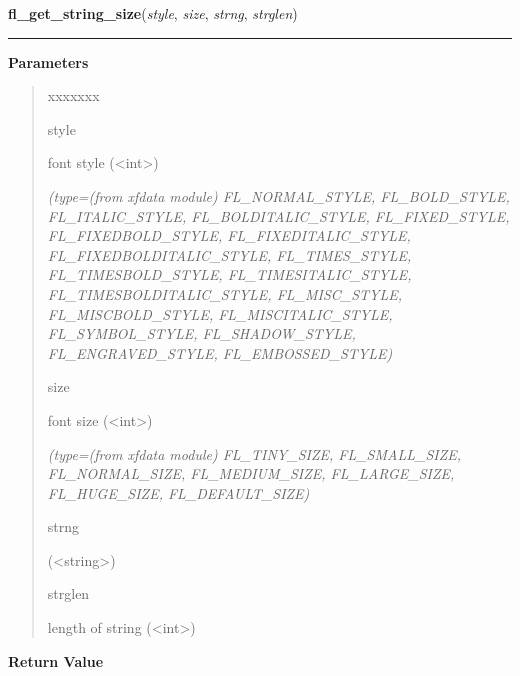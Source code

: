 \hspace{.8\funcindent}\begin{boxedminipage}{\funcwidth}

    \raggedright \textbf{fl\_get\_string\_size}(\textit{style}, \textit{size}, \textit{strng}, \textit{strglen})

    \vspace{-1.5ex}

    \rule{\textwidth}{0.5\fboxrule}
\setlength{\parskip}{2ex}
\setlength{\parskip}{1ex}
      \textbf{Parameters}
      \vspace{-1ex}

      \begin{quote}
        \begin{Ventry}{xxxxxxx}

          \item[style]

          font style ({\textless}int{\textgreater})

            {\it (type=(from xfdata module) FL\_NORMAL\_STYLE, FL\_BOLD\_STYLE, FL\_ITALIC\_STYLE,
FL\_BOLDITALIC\_STYLE, FL\_FIXED\_STYLE, FL\_FIXEDBOLD\_STYLE, 
FL\_FIXEDITALIC\_STYLE, FL\_FIXEDBOLDITALIC\_STYLE, FL\_TIMES\_STYLE, 
FL\_TIMESBOLD\_STYLE, FL\_TIMESITALIC\_STYLE, FL\_TIMESBOLDITALIC\_STYLE, 
FL\_MISC\_STYLE, FL\_MISCBOLD\_STYLE, FL\_MISCITALIC\_STYLE, 
FL\_SYMBOL\_STYLE, FL\_SHADOW\_STYLE, FL\_ENGRAVED\_STYLE, 
FL\_EMBOSSED\_STYLE)}

          \item[size]

          font size ({\textless}int{\textgreater})

            {\it (type=(from xfdata module) FL\_TINY\_SIZE, FL\_SMALL\_SIZE, FL\_NORMAL\_SIZE, 
FL\_MEDIUM\_SIZE, FL\_LARGE\_SIZE, FL\_HUGE\_SIZE, FL\_DEFAULT\_SIZE)}

          \item[strng]

          ({\textless}string{\textgreater})

          \item[strglen]

          length of string ({\textless}int{\textgreater})

        \end{Ventry}

      \end{quote}

      \textbf{Return Value}
    \vspace{-1ex}


\end{boxedminipage}
